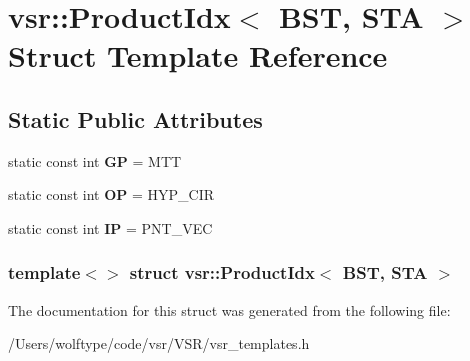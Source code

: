 \hypertarget{structvsr_1_1_product_idx_3_01_b_s_t_00_01_s_t_a_01_4}{\section{vsr\-:\-:Product\-Idx$<$ B\-S\-T, S\-T\-A $>$ Struct Template Reference}
\label{structvsr_1_1_product_idx_3_01_b_s_t_00_01_s_t_a_01_4}
}
\subsection*{Static Public Attributes}
\begin{DoxyCompactItemize}
\item 
\hypertarget{structvsr_1_1_product_idx_3_01_b_s_t_00_01_s_t_a_01_4_ab7ce551628560ee3257b55c7a4c56b40}{static const int {\bfseries G\-P} = M\-T\-T}\label{structvsr_1_1_product_idx_3_01_b_s_t_00_01_s_t_a_01_4_ab7ce551628560ee3257b55c7a4c56b40}

\item 
\hypertarget{structvsr_1_1_product_idx_3_01_b_s_t_00_01_s_t_a_01_4_a0a9e4adf276fdc2f08a7c96f0713b995}{static const int {\bfseries O\-P} = H\-Y\-P\-\_\-\-C\-I\-R}\label{structvsr_1_1_product_idx_3_01_b_s_t_00_01_s_t_a_01_4_a0a9e4adf276fdc2f08a7c96f0713b995}

\item 
\hypertarget{structvsr_1_1_product_idx_3_01_b_s_t_00_01_s_t_a_01_4_a295850c06302b7576fa3a84e19c67b74}{static const int {\bfseries I\-P} = P\-N\-T\-\_\-\-V\-E\-C}\label{structvsr_1_1_product_idx_3_01_b_s_t_00_01_s_t_a_01_4_a295850c06302b7576fa3a84e19c67b74}

\end{DoxyCompactItemize}
\subsubsection*{template$<$$>$ struct vsr\-::\-Product\-Idx$<$ B\-S\-T, S\-T\-A $>$}



The documentation for this struct was generated from the following file\-:\begin{DoxyCompactItemize}
\item 
/\-Users/wolftype/code/vsr/\-V\-S\-R/vsr\-\_\-templates.\-h\end{DoxyCompactItemize}

